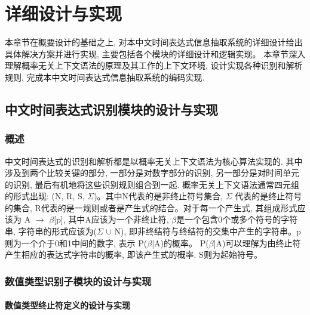 
\chapter{详细设计与实现}

本章节在概要设计的基础之上, 对本中文时间表达式信息抽取系统的详细设计给出具体解决方案并进行实现, 主要包括各个模块的详细设计和逻辑实现。
本章节深入理解概率无关上下文语法的原理及其工作的上下文环境, 设计实现各种识别和解析规则, 完成本中文时间表达式信息抽取系统的编码实现.


\section{中文时间表达式识别模块的设计与实现}

\subsection{概述}

中文时间表达式的识别和解析都是以概率无关上下文语法为核心算法实现的.
其中涉及到两个比较关键的部分, 一部分是对数字部分的识别, 另一部分是对时间单元的识别, 最后有机地将这些识别规则组合到一起.
概率无关上下文语法通常四元组的形式出现: (N, R, S,  $\varSigma$)。其中N代表的是非终止符号集合, $\varSigma$ 代表的是终止符号的集合,
R代表的是一规则或者是产生式的结合。对于每一个产生式, 其组成形式应该为 A $\rightarrow$ $\beta$[p], 其中A应该为一个非终止符, $\beta$是一个包含0个或多个符号的字符串,
字符串的形式应该为($\varSigma$ $\cup$ N), 即非终结符与终结符的交集中产生的字符串。p则为一个介于0和1中间的数字, 表示 P($\beta$|A)的概率。
P($\beta$|A)可以理解为由终止符产生相应的表达式字符串的概率, 即该产生式的概率.
S则为起始符号。


\subsection{数值类型识别子模块的设计与实现}

\subsubsection{数值类型终止符定义的设计与实现}

